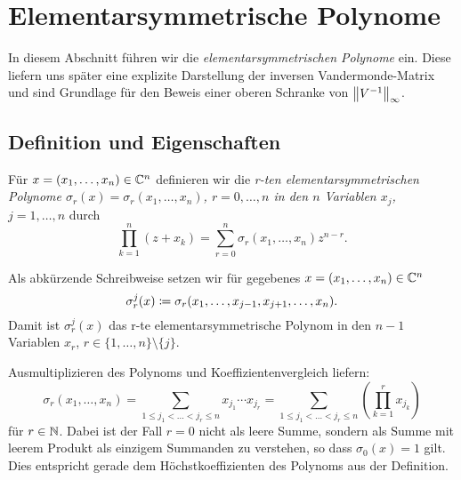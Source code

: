 \chapter{Elementarsymmetrische Polynome}

In diesem Abschnitt führen wir die \emph{elementarsymmetrischen Polynome} ein.
Diese liefern uns später eine explizite Darstellung der inversen
Vandermonde-Matrix und sind Grundlage für den Beweis einer oberen Schranke von
$\left\lVert V^{-1} \right\rVert_\infty$.

\section{Definition und Eigenschaften}

\begin{mydef}
    Für $x = (x_1, \dots, x_{n}) \in \mathbb{C}^n$ definieren wir die
    \emph{r-ten elementarsymmetrischen Polynome
    $\sigma_{r}(x) = \sigma_{r}(x_1, \dots, x_{n})$, $r = 0, \dots, n$
    in den $n$ Variablen $x_j$, $j = 1, \dots, n$} durch
    \[
        \prod_{k=1}^{n} (z + x_k)
        = \sum_{r=0}^{n} \sigma_{r}(x_1, \dots, x_{n}) z^{n-r}.
    \]
\end{mydef}

\begin{notation}
    Als abkürzende Schreibweise setzen wir für gegebenes
    $x = (x_1, \dots, x_{n}) \in \mathbb{C}^n$
    \[
        \sigma_{r}^{j}(x) \coloneqq \sigma_{r}(x_1, \dots, x_{j-1}, x_{j+1}, \dots, x_{n}).
    \]
    Damit ist $\sigma_{r}^{j}(x)$ das r-te elementarsymmetrische Polynom in den
    $n-1$ Variablen $x_r$, $r \in \{ 1, \dots, n \} \setminus \{ j \}$.
\end{notation}

\begin{remark}
    Ausmultiplizieren des Polynoms und Koeffizientenvergleich liefern:
    \begin{equation}
        \label{eq:explicit_elementary_symmetric_polynomials}
        \sigma_{r}(x_1, \dots, x_{n})
        = \sum_{1 \leq j_1 < \dots < j_r \leq n} x_{j_1} \cdots x_{j_r}
        = \sum_{1 \leq j_1 < \dots < j_r \leq n} \left( \prod_{k=1}^r x_{j_k} \right)
    \end{equation}
    für $r \in \mathbb{N}$.
    Dabei ist der Fall $r = 0$ nicht als leere Summe, sondern als Summe mit
    leerem Produkt als einzigem Summanden zu verstehen, so dass
    $\sigma_0(x) = 1$ gilt. Dies entspricht gerade dem Höchstkoeffizienten des
    Polynoms aus der Definition.
\end{remark}

